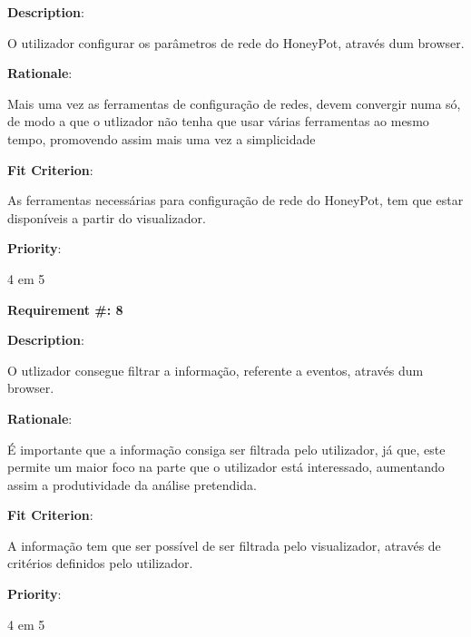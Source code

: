 \begin{description}
\item \textbf{Description}:

O utilizador configurar os parâmetros de rede do HoneyPot, através dum browser.

\item \textbf{Rationale}:

Mais uma vez as ferramentas de configuração de redes, devem convergir numa só, de modo a que o utlizador não tenha que usar várias ferramentas
ao mesmo tempo, promovendo assim mais uma vez a simplicidade

\item \textbf{Fit Criterion}:

As ferramentas necessárias para configuração de rede do HoneyPot, tem que estar disponíveis a partir do visualizador.

\item \textbf{Priority}:

4 em 5

\end{description}

\pagebreak






\begin{minipage}{0.55\textwidth}
\begin{flushleft}\textbf{Requirement \#: 8}\end{flushleft}
\end{minipage}
\begin{minipage}{0.4\textwidth}
\end{minipage}

\begin{description}
\item \textbf{Description}:

O utlizador consegue filtrar a informação, referente a eventos, através dum browser.

\item \textbf{Rationale}:

É importante que a informação consiga ser filtrada pelo utilizador, já que, este permite um maior foco na parte que o utilizador está
interessado, aumentando assim a produtividade da análise pretendida.

\item \textbf{Fit Criterion}:

A informação tem que ser possível de ser filtrada pelo visualizador, através de critérios definidos pelo utilizador.

\item \textbf{Priority}:

4 em 5

\end{description}

